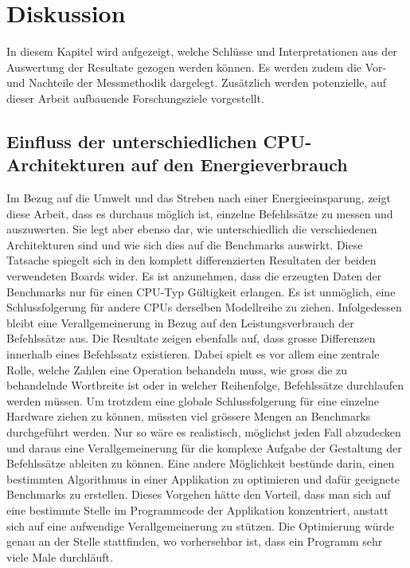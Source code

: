 \chapter{Diskussion}

In diesem Kapitel wird aufgezeigt, welche Schlüsse und Interpretationen aus der Auswertung der Resultate gezogen werden können. Es werden zudem die Vor- und Nachteile der Messmethodik dargelegt. Zusätzlich werden potenzielle, auf dieser Arbeit aufbauende Forschungsziele vorgestellt.

\section{Einfluss der unterschiedlichen CPU-Architekturen auf den Energieverbrauch}
Im Bezug auf die Umwelt und das Streben nach einer Energieeinsparung, zeigt diese Arbeit, dass es durchaus möglich ist, einzelne Befehlssätze zu messen und auszuwerten. Sie legt aber ebenso dar, wie unterschiedlich die verschiedenen Architekturen sind und wie sich dies auf die Benchmarks auswirkt. Diese Tatsache spiegelt sich in den komplett differenzierten Resultaten der beiden verwendeten Boards wider. Es ist anzunehmen, dass die erzeugten Daten der Benchmarks nur für einen CPU-Typ Gültigkeit erlangen. Es ist unmöglich, eine Schlussfolgerung für andere CPUs derselben Modellreihe zu ziehen. Infolgedessen bleibt eine Verallgemeinerung in Bezug auf den Leistungsverbrauch der Befehlssätze aus. Die Resultate zeigen ebenfalls auf, dass grosse Differenzen innerhalb eines Befehlssatz existieren. Dabei spielt es vor allem eine zentrale Rolle, welche Zahlen eine Operation behandeln muss, wie gross die zu behandelnde Wortbreite ist oder in welcher Reihenfolge, Befehlssätze durchlaufen werden müssen. Um trotzdem eine globale Schlussfolgerung für eine einzelne Hardware ziehen zu können, müssten viel grössere Mengen an Benchmarks durchgeführt werden. Nur so wäre es realistisch, möglichst jeden Fall abzudecken und daraus eine Verallgemeinerung für die komplexe Aufgabe der Gestaltung der Befehlssätze ableiten zu können. Eine andere Möglichkeit bestünde darin, einen bestimmten Algorithmus in einer Applikation zu optimieren und dafür geeignete Benchmarks zu erstellen. Dieses Vorgehen hätte den Vorteil, dass man sich auf eine bestimmte Stelle im Programmcode der Applikation konzentriert, anstatt sich auf eine aufwendige Verallgemeinerung zu stützen. Die Optimierung würde genau an der Stelle stattfinden, wo vorhersehbar ist, dass ein Programm sehr viele Male durchläuft.

